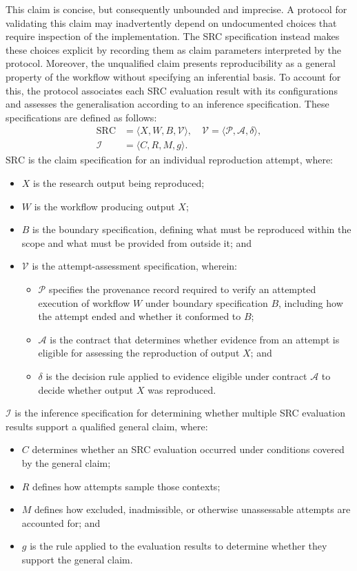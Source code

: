 \documentclass[conference,a4paper]{IEEEtran}
\begin{document}
  This claim is concise, but consequently unbounded and imprecise. A protocol for validating this claim may inadvertently depend on undocumented choices that require inspection of the implementation. The SRC specification instead makes these choices explicit by recording them as claim parameters interpreted by the protocol. Moreover, the unqualified claim presents reproducibility as a general property of the workflow without specifying an inferential basis. To account for this, the protocol associates each SRC evaluation result with its configurations and assesses the generalisation according to an inference specification. These specifications are defined as follows:
  \begin{align}
    \mathrm{SRC} &= \langle X,W,B,\mathcal V\rangle,
      \quad \mathcal V=\langle\mathcal P,\mathcal A,\delta\rangle,
      \label{eq:src} \\
    \mathcal I &= \langle C,R,M,g\rangle.
      \label{eq:inference-specification}
  \end{align}
  $\mathrm{SRC}$ is the claim specification for an individual reproduction attempt, where:
\begin{itemize}
  \item $X$ is the research output being reproduced;
  \item $W$ is the workflow producing output $X$;
  \item $B$ is the boundary specification, defining what must be reproduced within the scope and what must be provided from outside it; and
  \item $\mathcal V$ is the attempt-assessment specification, wherein:
    \begin{itemize}
      \item $\mathcal P$ specifies the provenance record required to verify an attempted execution of workflow $W$ under boundary specification $B$, including how the attempt ended and whether it conformed to $B$;
      \item $\mathcal A$ is the contract that determines whether evidence from an attempt is eligible for assessing the reproduction of output $X$; and
      \item $\delta$ is the decision rule applied to evidence eligible under contract $\mathcal A$ to
        decide whether output $X$ was reproduced.
    \end{itemize}
  \end{itemize}
  $\mathcal I$ is the inference specification for determining whether multiple
  SRC evaluation results support a qualified general claim, where:
  \begin{itemize}
    \item $C$ determines whether an SRC evaluation occurred under conditions covered by the general claim;
    \item $R$ defines how attempts sample those contexts;
    \item $M$ defines how excluded, inadmissible, or otherwise unassessable attempts are accounted for; and
    \item $g$ is the rule applied to the evaluation results to determine whether
    they support the general claim.
  \end{itemize}
\end{document}
